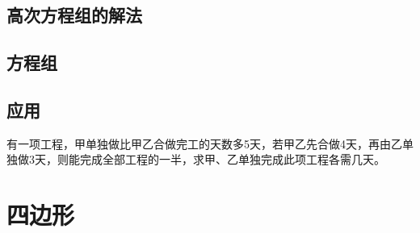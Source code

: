 \section{高次方程组的解法}
\clearpage
\section{方程组}
\clearpage
\section{应用}
\begin{problem}
有一项工程，甲单独做比甲乙合做完工的天数多5天，若甲乙先合做4天，再由乙单独做3天，则能完成全部工程的一半，求甲、乙单独完成此项工程各需几天。
\end{problem}
\clearpage
\chapter{四边形}
